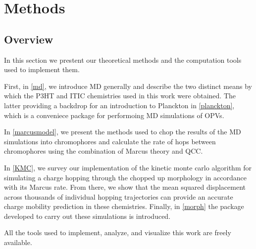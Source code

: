 \chapter{Methods}
\label{methods}
\section{Overview}

In this section we prestent our theoretical methods
and the computation tools used to implement them.

First, in \autoref{md}, we introduce MD generally and describe the two distinct means by 
which the P3HT and ITIC chemistries used in this work were obtained. 
The latter providing a backdrop for an introduction to Planckton in \autoref{planckton}, which
is a conveniece package for performoing MD simulations of OPVs.

In \autoref{marcusmodel}, we present the methods used to chop the
results of the MD simulations into chromophores and calculate the rate of hops between chromophores using the combination of Marcus theory and QCC. 

In \autoref{KMC}, we survey our implementation of the kinetic monte
carlo algorithm for simulating a charge hopping through the chopped up morphology in accordance with its
Marcus rate. 
From there, we show that the 
mean squared displacement across thousands of individual hopping trajectories can provide an accurate charge
mobility prediction in these chemistries.
Finally, in \autoref{morph} the package developed to carry out these simulations is introduced.
 
All the tools used to implement, analyze, and
visualize this work are freely available. 


